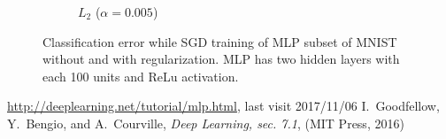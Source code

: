 \documentclass[a4paper,11pt]{article}
\begin{document}
\begin{figure}
\begin{subfigure}[b]{0.3\textwidth}
    \caption{$L_2$  ($\alpha=0.005$)}
    \label{fig:errorregl2}
  \end{subfigure}
  \caption{Classification error while SGD training of MLP subset of MNIST without and with
    regularization. MLP has two hidden layers with each 100 units and ReLu activation.}\label{fig:errorreg}
\end{figure}



\begin{thebibliography}{99}
  \url{http://deeplearning.net/tutorial/mlp.html}, last visit 2017/11/06
  I.\ Goodfellow, Y.\ Bengio, and A.\ Courville, \textit{Deep Learning, sec. 7.1},
  (MIT Press, 2016)
\end{thebibliography}
\end{document}
